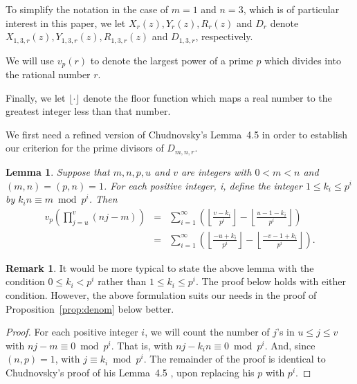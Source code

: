 \documentclass{jT}
\newtheorem{lemma}[theorem]{Lemma}
\theoremstyle{definition}
\newtheorem*{remark}{Remark}
\begin{document}
\noindent
To simplify the notation in the case of $m=1$ and $n=3$, which is of particular
interest in this paper, we let $X_{r}(z),Y_{r}(z),R_{r}(z)$ and $D_{r}$ denote
$X_{1,3,r}(z), Y_{1,3,r}(z), R_{1,3,r}(z)$ and $D_{1,3,r}$, respectively. 

\noindent
We will use $v_{p}(r)$ to denote the largest 
power of a prime $p$ which divides into the rational number $r$. 

\noindent
Finally, we let $\lfloor \cdot \rfloor$ denote the floor function which maps a real 
number to the greatest integer less than that number. 

\vspace{3.0mm}

We first need a refined version of Chudnovsky's Lemma~4.5 in order to establish
our criterion for the prime divisors of $D_{m,n,r}$.

\begin{lemma}
\label{lem:vp-prod}
Suppose that $m, n, p, u$ and $v$ are integers with $0<m<n$ and $(m,n)=(p,n)=1$.
For each positive integer, i, define the integer $1 \leq k_{i} \leq p^{i}$
by $k_{i}n \equiv m \bmod p^{i}$. Then
\begin{eqnarray*}
v_{p} \left( \prod_{j=u}^{v} (nj-m) \right)
& = & \sum_{i=1}^{\infty} 
      \left( \left\lfloor \frac{v-k_{i}}{p^{i}} \right\rfloor
	     - \left\lfloor \frac{u-1-k_{i}}{p^{i}} \right\rfloor \right) \\ 
& = & \sum_{i=1}^{\infty} 
      \left( \left\lfloor \frac{-u+k_{i}}{p^{i}} \right\rfloor
	     - \left\lfloor \frac{-v-1+k_{i}}{p^{i}} \right\rfloor \right).
\end{eqnarray*}
\end{lemma}

\begin{remark}
It would be more typical to state the above lemma with the condition
$0 \leq k_{i} < p^{i}$ rather than $1 \leq k_{i} \leq p^{i}$. The proof below
holds with either condition. However, the above formulation suits our needs
in  the proof of Proposition~\ref{prop:denom} below better.
\end{remark}

\begin{proof}
For each positive integer $i$, we will count the number of $j$'s in
$u \leq j \leq v$ with $nj-m \equiv 0 \bmod p^{i}$. That is, with
$nj-k_{i}n \equiv 0 \bmod p^{i}$. And, since $(n,p)=1$, with
$j \equiv k_{i} \bmod p^{i}$. The remainder of the proof is identical
to Chudnovsky's proof of his Lemma~4.5 \cite{Chud}, upon replacing
his $p$ with $p^{i}$.
\end{proof}
\end{document}
